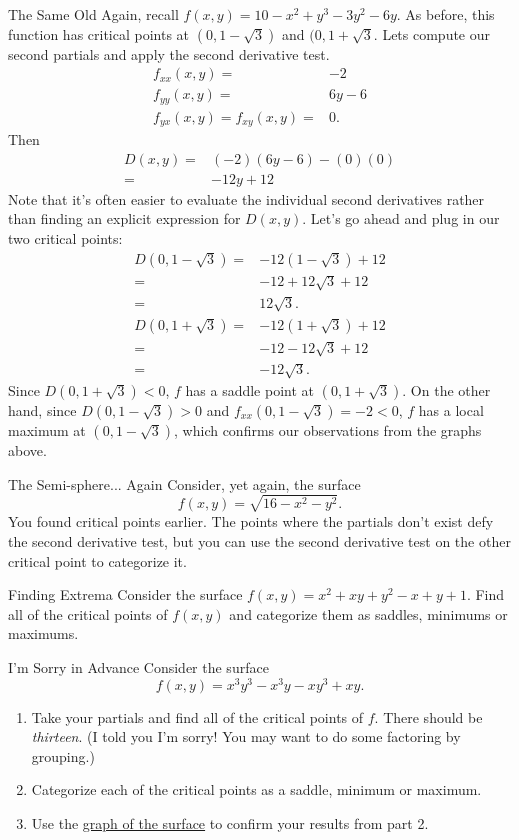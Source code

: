 \begin{example}{The Same Old}
Again, recall $f(x,y)=10-x^2+y^3-3y^2-6y$. As before, this function has critical points at $(0,1-\sqrt{3})$ and $(0,1+\sqrt{3}$. Lets compute our second partials and apply the second derivative test.
\begin{align*}
f_{xx}(x,y)=&-2\\
f_{yy}(x,y)=&6y-6\\
f_{yx}(x,y)=f_{xy}(x,y)=&0.
\end{align*}
Then \begin{align*}
D(x,y)=&(-2)(6y-6)-(0)(0)\\
=&-12y+12
\end{align*}
Note that it's often easier to evaluate the individual second derivatives rather than finding an explicit expression for $D(x,y)$. Let's go ahead and plug in our two critical points:
\begin{align*}
D(0,1-\sqrt{3})=&-12(1-\sqrt{3})+12\\
=&-12+12\sqrt{3}+12\\
=&12\sqrt{3}.\\
D(0,1+\sqrt{3})=&-12(1+\sqrt{3})+12\\
=&-12-12\sqrt{3}+12\\
=&-12\sqrt{3}.
\end{align*}
Since $D(0,1+\sqrt{3})<0$, $f$ has a saddle point at $(0, 1+\sqrt{3})$. On the other hand, since $D(0,1-\sqrt{3})>0$ and $f_{xx}(0,1-\sqrt{3})=-2<0$, $f$ has a local maximum at $(0, 1-\sqrt{3})$, which confirms our observations from the graphs above.
\end{example}

\begin{exercise}{The Semi-sphere... Again}
Consider, yet again, the surface $$f(x,y)=\sqrt{16-x^2-y^2}.$$ You found critical points earlier. The points where the partials don't exist defy the second derivative test, but you can use the second derivative test on the other critical point to categorize it.
\end{exercise}

\begin{exercise}{Finding Extrema}
Consider the surface $f(x,y)=x^2+xy+y^2-x+y+1$. Find all of the critical points of $f(x,y)$ and categorize them as saddles, minimums or maximums.
\end{exercise}

\begin{exercise}{I'm Sorry in Advance}
Consider the surface $$f(x,y)=x^3y^3-x^3y-xy^3+xy.$$
\begin{enumerate}
\item Take your partials and find all of the critical points of $f$. There should be \textit{thirteen}. (I told you I'm sorry! You may want to do some factoring by grouping.)
\vspace{1em}
\item Categorize each of the critical points as a saddle, minimum or maximum.
\vspace{1em}
\item Use the \href{https://www.geogebra.org/3d/nrqbqwen}{graph of the surface} to confirm your results from part 2.
\end{enumerate}
\end{exercise}
